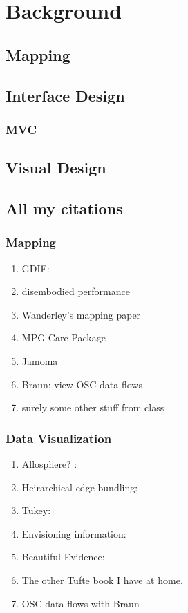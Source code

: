 \chapter{Background}

\section{Mapping}

\section{Interface Design}
\subsection{MVC}


\section{Visual Design}

\section{All my citations}

\subsection{Mapping}
	\begin{enumerate}
		\item GDIF: 
		\item disembodied performance
		\item Wanderley's mapping paper 
		\item MPG Care Package 
		\item Jamoma 
		\item Braun: view OSC data flows 
		\item surely some other stuff from class
	\end{enumerate}

\subsection{Data Visualization}
	\begin{enumerate}
		\item Allosphere? :
		\item Heirarchical edge bundling: 
		\item Tukey: 
		\item Envisioning information: 
		\item Beautiful Evidence: 
		\item The other Tufte book I have at home.
		\item OSC data flows with Braun 
	\end{enumerate}

